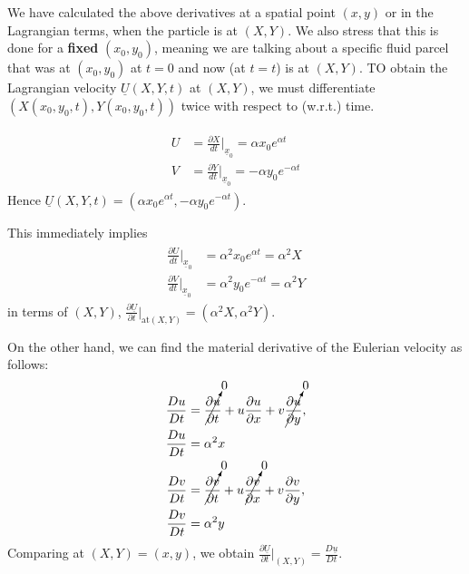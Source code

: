 \documentclass{article}
\begin{document}
We have calculated the above derivatives at a spatial point $(x, y)$ or in the Lagrangian terms, when the particle is at $(X, Y)$. We also stress that this is done for a \textbf{fixed} $(x_{0}, y_{0})$, meaning we are talking about a specific fluid parcel that was at $(x_{0}, y_{0})$ at $t=0$ and now (at $t=t$) is at $(X, Y)$. 
TO obtain the Lagrangian velocity $\underline{U}(X, Y, t)$ at $(X, Y)$, we must differentiate $(X(x_{0}, y_{0}, t),Y(x_{0}, y_{0}, t))$ twice with respect to (w.r.t.) time. 

\begin{align}\label{eq:lagrangian_velo}
 \begin{split}
  U & = \frac{\partial X}{dt}\bigg|_{\underline{x}_{0}} = \alpha x_{0} e^{\alpha t} \\
  V &= \frac{\partial Y}{dt}\bigg|_{\underline{x}_{0}} = -\alpha y_{0} e^{-\alpha t}
 \end{split}
\end{align}
Hence $\boxed{\underline{U}(X, Y, t) = (\alpha x_{0} e^{\alpha t}, -\alpha y_{0} e^{-\alpha t})}$.

This immediately implies
\begin{align}\label{eq:lagrangian_acc}
 \begin{split}
  \frac{\partial U}{dt}\bigg|_{\underline{x}_{0}} & = \alpha^{2} x_{0} e^{\alpha t} = \alpha^{2}X \\
  \frac{\partial V}{dt}\bigg|_{\underline{x}_{0}} &= \alpha^{2} y_{0} e^{-\alpha t} = \alpha^{2}Y
 \end{split}
\end{align}
in terms of $(X, Y)$, 
$\boxed{\frac{\partial \underline{U}}{\partial t} \bigg|_{\textrm{at} (X, Y)} = (\alpha^{2}X, \alpha^{2}Y)}$.

On the other hand, we can find the material derivative of the Eulerian velocity as follows:
\begin{align}\label{eq:eulerian_acc}
 \begin{split}
   \frac{Du}{Dt} &= \cancelto{0}{\frac{\partial u}{\partial t}} + u\frac{\partial u}{\partial x} + v \cancelto{0}{\frac{\partial u}{\partial y}},\\
   \frac{Du}{Dt} & = \alpha^{2}x \\
   \frac{Dv}{Dt} &= \cancelto{0}{\frac{\partial v}{\partial t}} + u \cancelto{0}{\frac{\partial v}{\partial x}} + v\frac{\partial v}{\partial y} ,\\
   \frac{Dv}{Dt} & = \alpha^{2}y \\
 \end{split}
\end{align}
Comparing at $(X,Y) = (x, y)$, we obtain $\boxed{\frac{\partial \underline{U}}{\partial t} \big|_{(X, Y)} = \frac{D\underline{u}}{Dt}}$.
\end{document}
